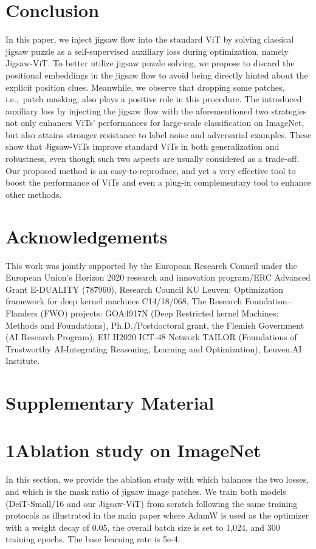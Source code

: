 \documentclass{article}
\begin{document}
\section{Conclusion}
\label{sec:conclusion}
In this paper, we inject jigsaw flow into the standard ViT by solving classical jigsaw puzzle as a self-supervised auxiliary loss during optimization, namely Jigsaw-ViT.
To better utilize jigsaw puzzle solving, we propose to discard the positional embeddings in the jigsaw flow to avoid being directly hinted about the explicit position clues. 
Meanwhile, we observe that dropping some patches, 
i.e.,~patch masking, also plays a positive role in this procedure. 
The introduced auxiliary loss by injecting the jigsaw flow with the aforementioned two strategies not only enhances ViTs' performances for large-scale classification on ImageNet, but also attains stronger resistance to label noise and adversarial examples.
These show that Jigsaw-ViTs improve standard ViTs in both generalization and robustness, even though such two aspects are usually considered as a trade-off.
Our proposed method is an easy-to-reproduce, and yet a very effective tool to boost the performance of ViTs and even a plug-in complementary tool to enhance other methods.

\section*{Acknowledgements}
This work was jointly supported by the European Research Council under the European Union’s Horizon 2020 research and innovation program/ERC Advanced Grant E-DUALITY (787960), Research Council KU Leuven: Optimization framework for deep kernel machines C14/18/068, The Research Foundation–Flanders (FWO) projects: GOA4917N (Deep Restricted kernel Machines: Methods and Foundations), Ph.D./Postdoctoral grant, the Flemish Government (AI Research Program), EU H2020 ICT-48 Network TAILOR (Foundations of Trustworthy AI-Integrating Reasoning, Learning and Optimization), Leuven.AI Institute.

  


\section*{Supplementary Material}

\section*{1\quad Ablation study on ImageNet}
In this section, we provide the ablation study with  which balances the two losses, and  which is the mask ratio of jigsaw image patches.
We train both models (DeiT-Small/16 and our Jigsaw-ViT) from scratch following the same training protocols as illustrated in the main paper where AdamW is used as the optimizer with a weight decay of 0.05, the overall batch size is set to 1,024, and 300 training epochs. 
The base learning rate is 5e-4. 
\end{document}
